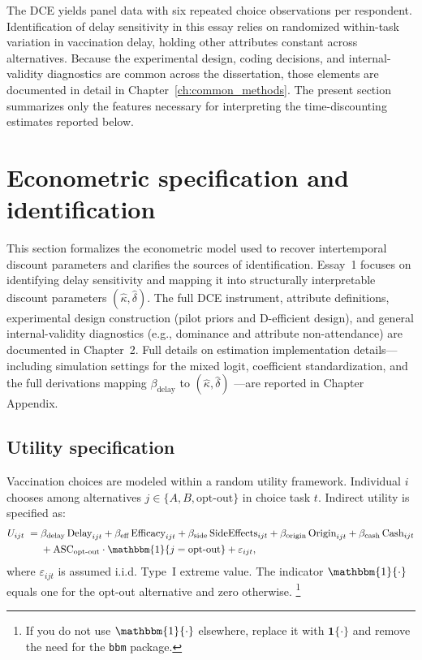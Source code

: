 \documentclass[doublespacing]{utdthesis}
\begin{document}
The DCE yields panel data with six repeated choice observations per respondent. Identification of delay sensitivity in this essay relies on randomized within-task variation in vaccination delay, holding other attributes constant across alternatives. Because the experimental design, coding decisions, and internal-validity diagnostics are common across the dissertation, those elements are documented in detail in Chapter~\ref{ch:common_methods}. The present section summarizes only the features necessary for interpreting the time-discounting estimates reported below.

\section{Econometric specification and identification}
\label{sec:essay1_model}
This section formalizes the econometric model used to recover intertemporal discount parameters and clarifies the sources of identification. Essay~1 focuses on identifying delay sensitivity and mapping it into structurally interpretable discount parameters $(\hat{\kappa},\hat{\delta})$. The full DCE instrument, attribute definitions, experimental design construction (pilot priors and D-efficient design), and general internal-validity diagnostics (e.g., dominance and attribute non-attendance) are documented in Chapter~2. Full details on estimation implementation details—including simulation settings for the mixed logit, coefficient standardization, and the full derivations mapping $\beta_{\text{delay}}$ to $(\hat{\kappa},\hat{\delta})$ —are reported in Chapter Appendix.

\subsection*{Utility specification}

Vaccination choices are modeled within a random utility framework. Individual $i$ chooses among alternatives $j \in \{A,B,\text{opt-out}\}$ in choice task $t$. Indirect utility is specified as:
\begin{align}
U_{ijt} \;=\;&
\beta_{\text{delay}}\, \text{Delay}_{ijt}
+ \beta_{\text{eff}}\, \text{Efficacy}_{ijt}
+ \beta_{\text{side}}\, \text{SideEffects}_{ijt}
+ \beta_{\text{origin}}\, \text{Origin}_{ijt}
+ \beta_{\text{cash}}\, \text{Cash}_{ijt}
\nonumber\\
&+ \text{ASC}_{\text{opt-out}} \cdot \mathbbm{1}\{j=\text{opt-out}\}
+ \varepsilon_{ijt},
\label{eq:utility_main}
\end{align}
where $\varepsilon_{ijt}$ is assumed i.i.d. Type~I extreme value. The indicator $\mathbbm{1}\{\cdot\}$ equals one for the opt-out alternative and zero otherwise.%
\footnote{If you do not use $\mathbbm{1}\{\cdot\}$ elsewhere, replace it with $\mathbf{1}\{\cdot\}$ and remove the need for the \texttt{bbm} package.}
\end{document}
